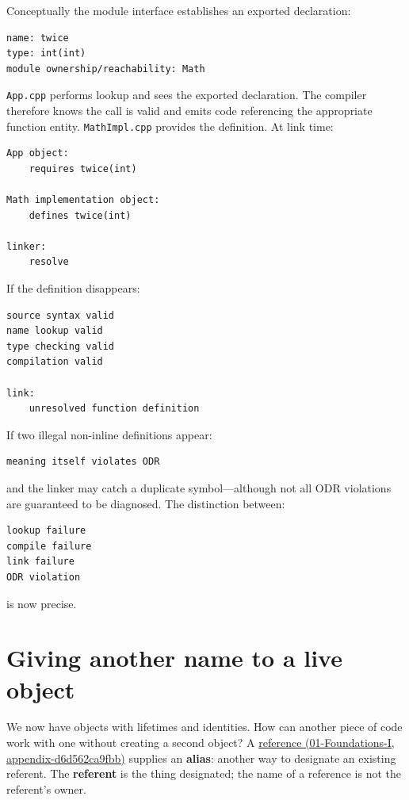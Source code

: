 Conceptually the module interface establishes an exported declaration:

\begin{verbatim}
name: twice
type: int(int)
module ownership/reachability: Math
\end{verbatim}

\texttt{App.cpp} performs lookup and sees the exported declaration. The compiler therefore knows the call is valid and emits code referencing the appropriate function entity. \texttt{MathImpl.cpp} provides the definition. At link time:

\begin{verbatim}
App object:
    requires twice(int)

Math implementation object:
    defines twice(int)

linker:
    resolve
\end{verbatim}

If the definition disappears:

\begin{verbatim}
source syntax valid
name lookup valid
type checking valid
compilation valid

link:
    unresolved function definition
\end{verbatim}

If two illegal non-inline definitions appear:

\begin{verbatim}
meaning itself violates ODR
\end{verbatim}

and the linker may catch a duplicate symbol---although not all ODR violations are guaranteed to be diagnosed. The distinction between:

\begin{verbatim}
lookup failure
compile failure
link failure
ODR violation
\end{verbatim}

is now precise.

\section{Giving another name to a live object}\label{05-engine-i-ch003-giving-another-name-to-a-live-object}

We now have objects with lifetimes and identities. How can another piece of code work with one without creating a second object? A \href{../01-Foundations-I/main.pdf\#nameddest=appendix-d6d562ca9fbb}{reference (01-Foundations-I, appendix-d6d562ca9fbb)} supplies an \textbf{alias}: another way to designate an existing referent. The \textbf{referent} is the thing designated; the name of a reference is not the referent's owner.

